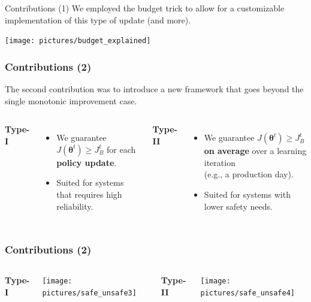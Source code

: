 \documentclass{beamer}
\makeatletter
\newcommand{\vtheta}{{\boldsymbol{\theta}}}
\DeclareRobustCommand{\eg}{e.g.,\@\xspace}
\newcommand{\jbase}[1][t]{{J_{B}^{#1}}}
\makeatother
\begin{document}
\begin{frame}{Contributions (1)}
We employed the budget trick to allow for a customizable implementation of this type of update (and more).
\vfill

\centering
\texttt{[image: pictures/budget\_explained]}
\end{frame}




\begin{frame}
\frametitle{Contributions (2)}
The second contribution was to introduce a new framework that goes beyond the single monotonic improvement case.
\vspace{0.3cm}
\begin{columns}[T]
\centering
\textbf{Type-I}
\vspace{0.3cm}
\begin{itemize}
\item We guarantee $J(\vtheta^t) \geq \jbase$ for each \textbf{policy update}.
\item Suited for systems that requires high reliability.
\end{itemize}
\centering
\textbf{Type-II}
\vspace{0.3cm}
\begin{itemize}
\item We guarantee $J(\vtheta^t)\geq \jbase$  \textbf{on average} over a learning iteration \\ (\eg a production day).
\item Suited for systems with lower safety needs.
\end{itemize}
\end{columns}

\end{frame}

\begin{frame}
\frametitle{Contributions (2)}
\begin{columns}[T]
\centering
\textbf{Type-I}

\texttt{[image: pictures/safe\_unsafe3]}

\centering
\textbf{Type-II}

\texttt{[image: pictures/safe\_unsafe4]}

\end{columns}
\end{frame}
\end{document}

